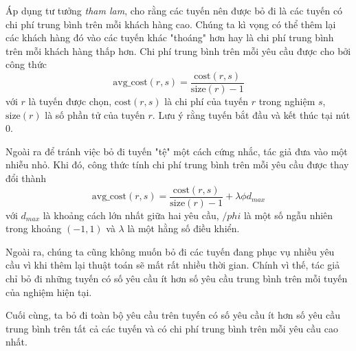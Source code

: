 Áp dụng tư tưởng \textit{tham lam}, cho rằng các tuyến nên được bỏ đi là các tuyến có chi phí trung bình trên mỗi khách hàng cao. Chúng ta kì vọng có thể thêm lại các khách hàng đó vào các tuyến khác "thoáng" hơn hay là chi phí trung bình trên mỗi khách hàng thấp hơn. Chi phí trung bình trên mỗi yêu cầu được cho bởi công thức
\begin{equation}
	\label{eq:destroy_route}
	\text{avg\_cost}(r, s) = \frac{\text{cost}(r, s)}{\text{size}(r)-1}
\end{equation}
với $r$ là tuyến được chọn, $\text{cost}(r,s)$ là chi phí của tuyến $r$ trong nghiệm $s$, $\text{size}(r)$ là số phần tử của tuyến $r$. Lưu ý rằng tuyến bắt đầu và kết thúc tại nút $0$.

Ngoài ra để tránh việc bỏ đi tuyến "tệ" một cách cứng nhắc, tác giả đưa vào một nhiễu nhỏ. Khi đó, công thức tính chi phí trung bình trên mỗi yêu cầu được thay đổi thành
\begin{equation}
	\label{eq:destroy_route}
	\text{avg\_cost}(r, s) = \frac{\text{cost}(r, s)}{\text{size}(r)-1} + \lambda \phi d_{max}
\end{equation}
với $d_{max}$ là khoảng cách lớn nhất giữa hai yêu cầu, $/phi$ là một số ngẫu nhiên trong khoảng $(-1,1)$ và $\lambda$ là một hằng số điều khiển.

Ngoài ra, chúng ta cũng không muốn bỏ đi các tuyến đang phục vụ nhiều yêu cầu vì khi thêm lại thuật toán sẽ mất rất nhiều thời gian. Chính vì thế, tác giả chỉ bỏ đi những tuyến có số yêu cầu ít hơn số yêu cầu trung bình trên mỗi tuyến của nghiệm hiện tại.

Cuối cùng, ta bỏ đi toàn bộ yêu cầu trên tuyến có số yêu cầu ít hơn số yêu cầu trung bình trên tất cả các tuyến và có chi phí trung bình trên mỗi yêu cầu cao nhất.
